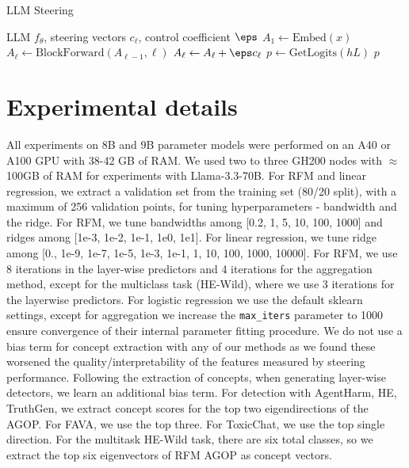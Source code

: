 \begin{algorithm}[h]
\caption{LLM Steering}
\label{alg: steering}
\begin{algorithmic}[1]
\Require LLM $f_\theta$, steering vectors ${c_\ell}$, control coefficient $\eps$
\State $A_1 \gets \text{Embed}(x)$ 
\State $A_\ell \gets \text{BlockForward}(A_{\ell-1}, \ell)$ 
\State $A_\ell \gets A_\ell + \eps c_\ell$
\EndFor
\State $p \gets \text{GetLogits}(hL)$ 
\Return $p$
\EndProcedure\\
\end{algorithmic}
\end{algorithm}


\section{Experimental details}
\label{app: experimental details}
All experiments on 8B and 9B parameter models were performed on an A40 or A100 GPU with 38-42 GB of RAM. We used two to three GH200 nodes with $\approx$100GB of RAM for experiments with Llama-3.3-70B. For RFM and linear regression, we extract a validation set from the training set (80/20 split), with a maximum of 256 validation points, for tuning hyperparameters - bandwidth and the ridge. For RFM, we tune bandwidths among [0.2, 1, 5, 10, 100, 1000] and ridges among [1e-3, 1e-2, 1e-1, 1e0, 1e1]. For linear regression, we tune ridge among [0., 1e-9, 1e-7, 1e-5, 1e-3, 1e-1, 1, 10, 100, 1000, 10000]. For RFM, we use 8 iterations in the layer-wise predictors and 4 iterations for the aggregation method, except for the multiclass task (HE-Wild), where we use 3 iterations for the layerwise predictors. For logistic regression we use the default sklearn settings, except for aggregation we increase the \texttt{max\_iters} parameter to 1000 ensure convergence of their internal parameter fitting procedure. We do not use a bias term for concept extraction with any of our methods as we found these worsened the quality/interpretability of the features measured by steering performance. Following the extraction of concepts, when generating layer-wise detectors, we learn an additional bias term. For detection with AgentHarm, HE, TruthGen, we extract concept scores for the top two eigendirections of the AGOP. For FAVA, we use the top three. For ToxicChat, we use the top single direction. For the multitask HE-Wild task, there are six total classes, so we extract the top six eigenvectors of RFM AGOP as concept vectors.

